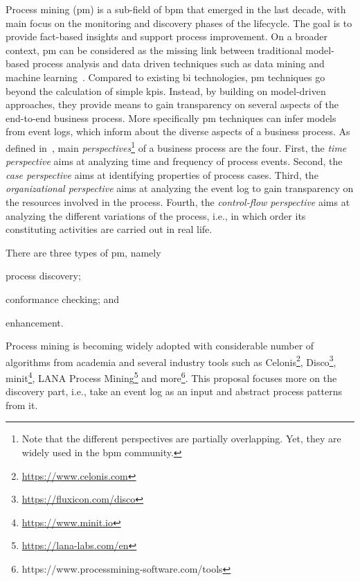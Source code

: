 Process mining (\gls{pm}) is a sub-field of \gls{bpm} that emerged in the last decade, with main focus on the monitoring and discovery phases of the lifecycle. The goal is to provide fact-based insights and support process improvement. On a broader context, \gls{pm} can be considered as the missing link between traditional model-based process analysis and data driven techniques such as data mining and machine learning~\citep{DBLP:books/sp/Aalst16}. Compared to existing \gls{bi} technologies, \gls{pm} techniques go beyond the calculation of simple \glspl{kpi}. Instead, by building on model-driven approaches, they provide means to gain transparency on several aspects of the end-to-end business process. More specifically \gls{pm} techniques can infer models from event logs, which inform about the diverse aspects of a business process.
As defined in~\citep{DBLP:books/sp/Aalst16}, main \emph{perspectives}\footnote{Note that the different perspectives are partially overlapping. Yet, they are widely used in the \gls{bpm} community.} of a business process are the four. First, the \emph{time perspective} aims at analyzing time and frequency of process events. Second, the \emph{case perspective} aims at identifying properties of process cases. Third, the \emph{organizational perspective} aims at analyzing the event log to gain transparency on the resources involved in the process. Fourth, the \emph{control-flow perspective} aims at analyzing the different variations of the process, i.e., in which order its constituting activities are carried out in real life. 


There are three types of \gls{pm}, namely \begin{inparaenum}[\itshape i)]
	\item process discovery;
	\item conformance checking; and
	\item enhancement.
\end{inparaenum}
Process mining is becoming widely adopted with considerable number of algorithms from academia and several industry tools such as Celonis\footnote{\url{https://www.celonis.com}}, Disco\footnote{\url{https://fluxicon.com/disco}}, minit\footnote{\url{https://www.minit.io}}, LANA Process Mining\footnote{\url{https://lana-labs.com/en}} and more\footnote{https://www.processmining-software.com/tools}. 
This proposal focuses more on the discovery part, i.e., take an event log as an input and abstract process patterns from it. 


